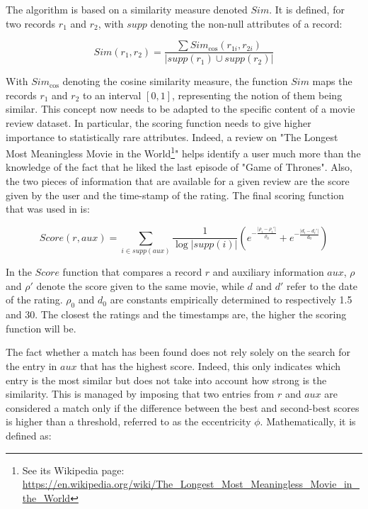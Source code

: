 The algorithm is based on a similarity measure denoted $Sim$. It is defined, for two records $r_1$ and $r_2$, with $supp$ denoting the non-null attributes of a record:

\begin{equation}
	Sim(r_1, r_2) = \frac{\sum Sim_{\text{cos}}(r_{1i}, r_{2i})}{\lvert supp(r_1) \cup supp(r_2) \rvert}
\end{equation} 

With $Sim_{\text{cos}}$ denoting the cosine similarity measure, the function $Sim$ maps the records $r_1$ and $r_2$ to an interval $[0,1]$, representing the notion of them being similar. This concept now needs to be adapted to the specific content of a movie review dataset. In particular, the scoring function needs to give higher importance to statistically rare attributes. Indeed, a review on "The Longest Most Meaningless Movie in the World\footnote{See its Wikipedia page: \url{https://en.wikipedia.org/wiki/The_Longest_Most_Meaningless_Movie_in_the_World}}" helps identify a user much more than the knowledge of the fact that he liked the last episode of "Game of Thrones". Also, the two pieces of information that are available for a given review are the score given by the user and the time-stamp of the rating. The final scoring function that was used in \cite{netflix} is:

\begin{equation}\label{eq:score}
	Score(r,aux) = \sum_{i \in supp(aux)} \frac{1}{\log\lvert supp(i) \rvert} \left( e^{-\frac{ \lvert \rho_i - \rho_i'  \rvert}{\rho_0}} + e^{-\frac{\lvert d_i - d_i' \rvert}{d_0}}\right)
\end{equation}

In the $Score$ function that compares a record $r$ and auxiliary information $aux$, $\rho$ and $\rho'$ denote the score given to the same movie, while $d$ and $d'$ refer to the date of the rating. $\rho_0$ and $d_0$ are constants empirically determined to respectively 1.5 and 30. The closest the ratings and the timestamps are, the higher the scoring function will be.

The fact whether a match has been found does not rely solely on the search for the entry in $aux$ that has the highest score. Indeed, this only indicates which entry is the most similar but does not take into account how strong is the similarity. This is managed by imposing that two entries from $r$ and $aux$ are considered a match only if the difference between the best and second-best scores is higher than a threshold, referred to as the eccentricity $\phi$. Mathematically, it is defined as:

